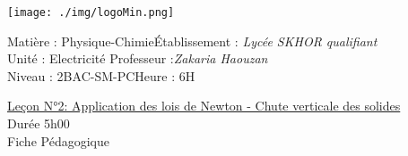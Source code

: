 \documentclass[12pt]{article}
\newcommand\headerMe[2]{\noindent{}#1\hfill#2}
\begin{document}
\begin{center}
	\texttt{[image: ./img/logoMin.png]}
	\vspace{-3cm}
\end{center}
\headerMe{Matière : Physique-Chimie}{Établissement : \emph{Lycée SKHOR qualifiant}}\\
\headerMe{ Unité : Electricité}{  Professeur :\emph{Zakaria Haouzan}}\\
\headerMe{Niveau : 2BAC-SM-PC}{Heure : 6H}\\

\begin{center}
	\underline{Leçon N°2: Application des lois de Newton - Chute verticale des solides}\\
	Durée 5h00
	\\
	\vspace{.2cm}
	\hrulefill
	\Large{Fiche Pédagogique}
	\hrulefill\\
\end{center}
\end{document}
